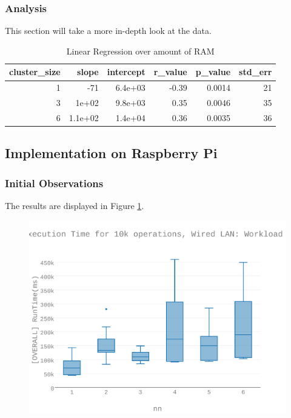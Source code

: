\subsubsection{Analysis}
This section will take a more in-depth look at the data.


\begin{table}[H]
\centering
\begin{tabular}{rrrrrr}
\toprule
 cluster\_size &   slope &  intercept &  r\_value &  p\_value &  std\_err \\
\midrule
            1 &     -71 &    6.4e+03 &    -0.39 &   0.0014 &       21 \\
            3 &   1e+02 &    9.8e+03 &     0.35 &   0.0046 &       35 \\
            6 & 1.1e+02 &    1.4e+04 &     0.36 &   0.0035 &       36 \\
\bottomrule
\end{tabular}
\caption{Linear Regression over amount of RAM}
\label{table:ram_v_ram_c}
\end{table}



\subsection{Implementation on Raspberry Pi}
\subsubsection{Initial Observations}
The results are displayed in Figure \ref{figures-wlc_fig10}.  \begin{figure}[h]
\includegraphics[width=5.5in]{Figures/figures-wlc_fig10.pdf}
\caption{}
\label{figures-wlc_fig10}
\end{figure}



